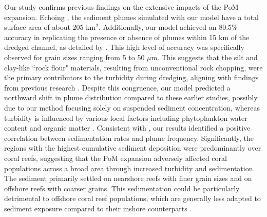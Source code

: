 \documentclass[preprint,12pt,authoryear]{elsarticle}
\begin{document}
Our study confirms previous findings on the extensive impacts of the PoM expansion. Echoing \cite{barnes2015sediment}, the sediment plumes simulated with our model have a total surface area of about 205 km$^2$. Additionally, our model achieved an 80.5\% accuracy in replicating the presence or absence of plumes within 15 km of the dredged channel, as detailed by \cite{cunning2019extensive}. This high level of accuracy was specifically observed for grain sizes ranging from 5 to 50 $\mu$m. This suggests that the silt and clay-like ``rock flour" materials, resulting from unconventional rock chopping, were the primary contributors to the turbidity during dredging, aligning with findings from previous research \citep{storlazzi2015influence,fourney2017additive}. Despite this congruence, our model predicted a northward shift in plume distribution compared to these earlier studies, possibly due to our method focusing solely on suspended sediment concentration, whereas turbidity is influenced by various local factors including phytoplankton water content and organic matter \citep{gray2000comparability,thackston2000improved}. Consistent with \cite{cunning2019extensive}, our results identified a positive correlation between sedimentation rates and plume frequency. Significantly, the regions with the highest cumulative sediment deposition were predominantly over coral reefs, suggesting that the PoM expansion adversely affected coral populations across a broad area through increased turbidity and sedimentation. The sediment primarily settled on nearshore reefs with finer grain sizes and on offshore reefs with coarser grains. This sedimentation could be particularly detrimental to offshore coral reef populations, which are generally less adapted to sediment exposure compared to their inshore counterparts \citep{wolanski2005fine}.
\end{document}
